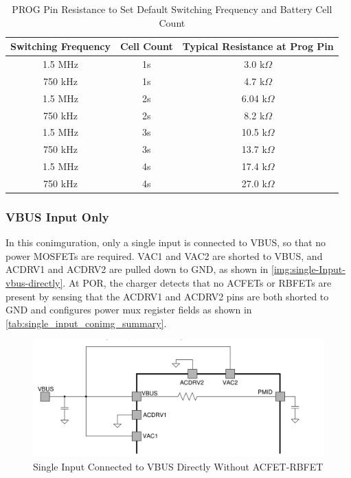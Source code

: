 \documentclass[12pt]{article}
\begin{document}
\begin{table}[H]
    \centering
    \begin{tabular}{|c|c|c|}
        \hline
        \rowcolor{headerbg}
        \textcolor{headerfg}{\textbf{Switching Frequency}} & 
        \textcolor{headerfg}{\textbf{Cell Count}} & 
        \textcolor{headerfg}{\textbf{Typical Resistance at Prog Pin}} \\
        \hline
        1.5 MHz & 1s & 3.0 k$\Omega$ \\
        750 kHz & 1s & 4.7 k$\Omega$ \\
        1.5 MHz & 2s & 6.04 k$\Omega$ \\
        750 kHz & 2s & 8.2 k$\Omega$ \\
        1.5 MHz & 3s & 10.5 k$\Omega$ \\
        750 kHz & 3s & 13.7 k$\Omega$ \\
        1.5 MHz & 4s & 17.4 k$\Omega$ \\
        750 kHz & 4s & 27.0 k$\Omega$ \\
        \hline
    \end{tabular}
    \caption{PROG Pin Resistance to Set Default Switching Frequency and Battery Cell Count}
    \label{tab:frequency_resistance}
\end{table}

\subsubsection{VBUS Input Only}
In this conimguration, only a single input is connected to VBUS, so that no power MOSFETs are required. VAC1
and VAC2 are shorted to VBUS, and ACDRV1 and ACDRV2 are pulled down to GND, as shown in \autoref{img:single-Input-vbus-directly}.
At POR, the charger detects that no ACFETs or RBFETs are present by sensing that the ACDRV1 and ACDRV2
pins are both shorted to GND and configures power mux register fields as shown in \autoref{tab:single_input_conimg_summary}.

\begin{figure}[H]
    \centering
    \includegraphics[width=.8\linewidth]{Single Input Connected to VBUS Directly Without ACFET-RBFET.png}
    \caption{Single Input Connected to VBUS Directly Without ACFET-RBFET}
    \label{img:single-Input-vbus-directly}
\end{figure}
\end{document}
